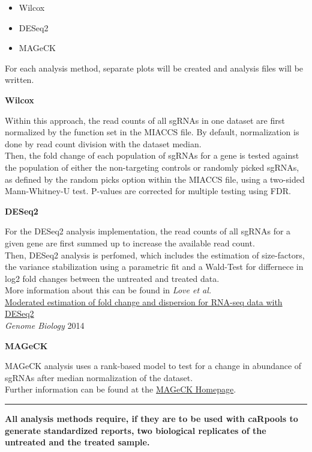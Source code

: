 \documentclass[]{article}
\providecommand{\tightlist}{%
  \setlength{\itemsep}{0pt}\setlength{\parskip}{0pt}}
\begin{document}
\begin{itemize}
\tightlist
\item
  Wilcox
\item
  DESeq2
\item
  MAGeCK
\end{itemize}

For each analysis method, separate plots will be created and analysis
files will be written.

\textbf{Wilcox}

Within this approach, the read counts of all sgRNAs in one dataset are
first normalized by the function set in the MIACCS file. By default,
normalization is done by read count division with the dataset median.\\
Then, the fold change of each population of sgRNAs for a gene is tested
against the population of either the non-targeting controls or randomly
picked sgRNAs, as defined by the random picks option within the MIACCS
file, using a two-sided Mann-Whitney-U test. P-values are corrected for
multiple testing using FDR.

\textbf{DESeq2}

For the DESeq2 analysis implementation, the read counts of all sgRNAs
for a given gene are first summed up to increase the available read
count.\\
Then, DESeq2 analysis is perfomed, which includes the estimation of
size-factors, the variance stabilization using a parametric fit and a
Wald-Test for differnece in log2 fold changes between the untreated and
treated data.\\
More information about this can be found in \emph{Love et al.}\\
\href{http://www.ncbi.nlm.nih.gov/pubmed/25516281}{Moderated estimation
of fold change and dispersion for RNA-seq data with DESeq2}\\
\emph{Genome Biology} 2014

\textbf{MAGeCK}

MAGeCK analysis uses a rank-based model to test for a change in
abundance of sgRNAs after median normalization of the dataset.\\
Further information can be found at the
\href{http://sourceforge.net/projects/mageck/}{MAGeCK Homepage}.

\begin{center}\rule{0.5\linewidth}{\linethickness}\end{center}

\textbf{All analysis methods require, if they are to be used with
caRpools to generate standardized reports, two biological replicates of
the untreated and the treated sample.}
\end{document}
